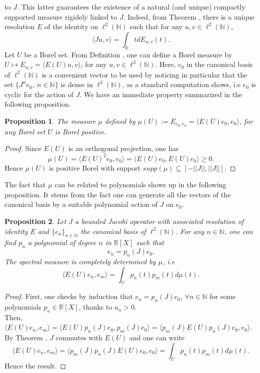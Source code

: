 \documentclass[10pt]{book}
\let\int\int
\theoremstyle{break}
\newtheorem{proposition}{Proposition}
\begin{document}
to $J$. This latter guarantees the existence of a natural (and unique) compactly supported measure rigidely linked to $J$. Indeed, from Theorem %
, there is a unique resolution $E$ of the identity on $\ell^2(\mathbb{N})$ such that for any $u,v\in\ell^2(\mathbb{N})$, 
\begin{equation*}
\langle Ju,v \rangle=\int_\mathbb{R}tdE_{u,v}(t). 
\end{equation*}
Let $U$ be a Borel set. From Definition %
, one can define a Borel measure by $U\mapsto E_{u,v}=\langle E(U)u,v \rangle$, for any $u,v\in\ell^2(\mathbb{N})$. Here, $e_0$ in the canonical basis of $\ell^2(\mathbb{N})$ is a convenient vector to be used by noticing in particular that the set $\{J^ne_0,\ n\in\mathbb{N}\}$ is dense in $\ell^2(\mathbb{N})$, as a standard computation shows, i.e $e_0$ is cyclic for the action of $J$. We have an immediate property summarized in the following proposition.
\begin{proposition}
The measure $\mu$ defined by $\mu(U):=E_{e_0,e_0}=\langle E(U)e_0,e_0 \rangle$, for any Borel set $U$ is Borel positive.
\end{proposition}
\begin{proof}
Since $E(U)$ is an orthogonal projection, one has 
\begin{equation*}
\mu(U)=\langle E(U)^2e_0,e_0  \rangle=\langle E(U)e_0,E(U)e_0\rangle\ge0. 
\end{equation*}
Hence $\mu(U)$ is positive Borel with support $supp(\mu)\subseteq[-||J||,||J||]$. 
\end{proof}
The fact that $\mu$ can be related to polynomials shows up in the following proposition. It stems from the fact one can generate all the vectors of the canonical basis by a suitable polynomial action of $J$ on $e_0$.
\begin{proposition}
Let $J$ a bounded Jacobi operator with associated resolution of identity $E$ and $\{e_n\}_{n\in\mathbb{N}}$ the canonical basis of $\ell^2(\mathbb{N})$. For any $n\in\mathbb{N}$, one can find $p_n$ a polynomial of degree $n$ in $\mathbb{R}[X]$ such that
\begin{equation*}
e_n=p_n(J)e_0.
\end{equation*}
The spectral measure is completely determined by $\mu$, i.e
\begin{equation*}
\langle E(U)e_n,e_m \rangle=\int_{U}p_n(t)p_m(t)d\mu(t).
\end{equation*}
\end{proposition}
\begin{proof}
First, one checks by induction that $e_n=p_n(J)e_0$, $\forall n\in\mathbb{N}$ for some polynomials $p_n\in\mathbb{R}[X]$, thanks to $a_n>0$. \\
Then, $\langle E(U)e_n,e_m \rangle=\langle E(U)p_n(J)e_0,p_m(J)e_0\rangle=\langle p_m(J)E(U)p_n(J)e_0,e_0\rangle$. By Theorem %
, $J$ commutes with $E(U)$ and one can write 
\begin{equation*}
\langle E(U)e_n,e_m \rangle=\langle p_m(J)p_n(J)E(U)e_0,e_0\rangle=\int_{U}p_n(t)p_m(t)d\mu(t).
\end{equation*}
Hence the result.
\end{proof}
\end{document}
